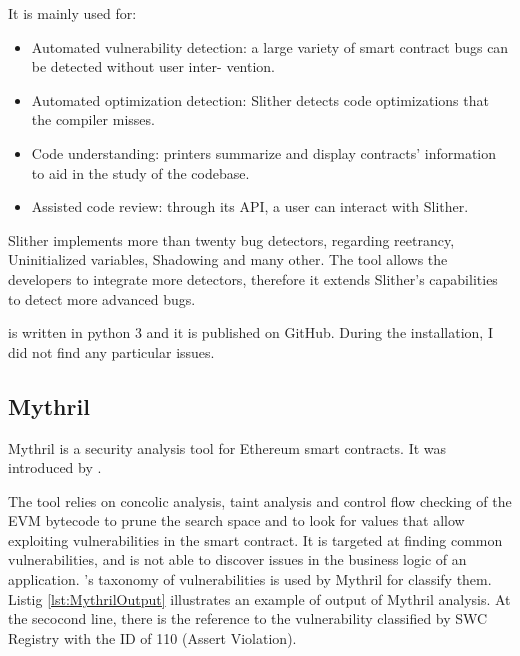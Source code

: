 It is mainly used for:
\begin{itemize}
    \item Automated vulnerability detection: a large variety of
    smart contract bugs can be detected without user inter-
    vention.
    \item Automated optimization detection: Slither detects code
    optimizations that the compiler misses.
    \item Code understanding: printers summarize and display
    contracts' information to aid in the study of the codebase.
    \item Assisted code review: through its API, a user can interact
    with Slither.
\end{itemize}

Slither implements more than twenty bug detectors, regarding reetrancy, Uninitialized variables,
Shadowing and many other. The tool allows the developers to integrate more detectors, therefore it extends Slither's capabilities
to detect more advanced bugs.

\citet{SlitherGitHub} is written in python 3 and it is published on GitHub.
During the installation, I did not find any particular issues.

\subsection{Mythril}
\label{sec:WithoutSpecification:Mythril}
Mythril is a security analysis tool for Ethereum smart contracts. It was introduced by \citet{Mythril}.

The tool  relies on concolic analysis, taint analysis and control flow checking of the EVM bytecode to
prune the search space and to look for values that allow exploiting
vulnerabilities in the smart contract.
It is targeted at finding common vulnerabilities, 
and is not able to discover issues in the business logic of an application. \citet{SWCRegistry}'s taxonomy of vulnerabilities is used by Mythril for classify them. 
Listig \autoref{lst:MythrilOutput} illustrates an example of output of Mythril analysis. 
At the secocond line, there is the reference to the vulnerability classified by SWC Registry with the ID of 110 (Assert Violation).



